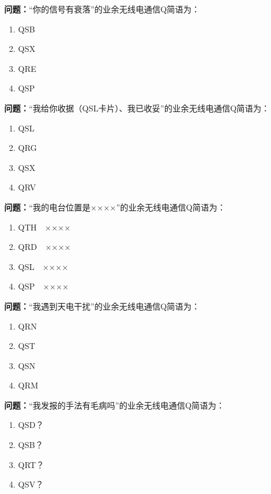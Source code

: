 \bigskip


\noindent\textbf{问题：}“你的信号有衰落”的业余无线电通信Q简语为：
\begin{enumerate}[label=\Alph*), leftmargin=3em]
\item QSB
\item QSX
\item QRE
\item QSP
\end{enumerate}

\bigskip


\noindent\textbf{问题：}“我给你收据（QSL卡片）、我已收妥”的业余无线电通信Q简语为：
\begin{enumerate}[label=\Alph*), leftmargin=3em]
\item QSL
\item QRG
\item QSX
\item QRV
\end{enumerate}

\bigskip


\noindent\textbf{问题：}“我的电台位置是××××”的业余无线电通信Q简语为：
\begin{enumerate}[label=\Alph*), leftmargin=3em]
\item QTH　××××
\item QRD　××××
\item QSL　××××
\item QSP　××××
\end{enumerate}

\bigskip


\noindent\textbf{问题：}“我遇到天电干扰”的业余无线电通信Q简语为：
\begin{enumerate}[label=\Alph*), leftmargin=3em]
\item QRN
\item QST
\item QSN
\item QRM
\end{enumerate}

\bigskip


\noindent\textbf{问题：}“我发报的手法有毛病吗”的业余无线电通信Q简语为：
\begin{enumerate}[label=\Alph*), leftmargin=3em]
\item QSD？
\item QSB？
\item QRT？
\item QSV？
\end{enumerate}

\bigskip


